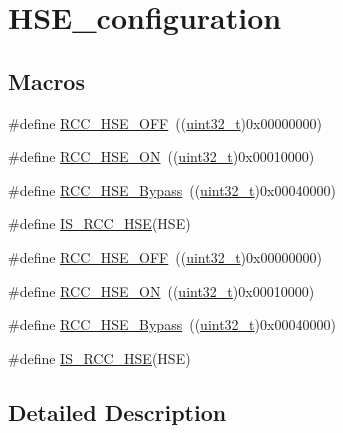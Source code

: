 \hypertarget{group___h_s_e__configuration}{}\section{H\+S\+E\+\_\+configuration}
\label{group___h_s_e__configuration}
\subsection*{Macros}
\begin{DoxyCompactItemize}
\item 
\#define \hyperlink{group___h_s_e__configuration_ga1616626d23fbce440398578855df6f97}{R\+C\+C\+\_\+\+H\+S\+E\+\_\+\+O\+FF}~((\hyperlink{_p_e___types_8h_a33594304e786b158f3fb30289278f5af}{uint32\+\_\+t})0x00000000)
\item 
\#define \hyperlink{group___h_s_e__configuration_gabc4f70a44776c557af20496b04d9a9db}{R\+C\+C\+\_\+\+H\+S\+E\+\_\+\+ON}~((\hyperlink{_p_e___types_8h_a33594304e786b158f3fb30289278f5af}{uint32\+\_\+t})0x00010000)
\item 
\#define \hyperlink{group___h_s_e__configuration_ga09061e9909d5f588baa7bfb0f7edd9fa}{R\+C\+C\+\_\+\+H\+S\+E\+\_\+\+Bypass}~((\hyperlink{_p_e___types_8h_a33594304e786b158f3fb30289278f5af}{uint32\+\_\+t})0x00040000)
\item 
\#define \hyperlink{group___h_s_e__configuration_ga287bbcafd73d07ec915c2f793301908a}{I\+S\+\_\+\+R\+C\+C\+\_\+\+H\+SE}(H\+SE)
\item 
\#define \hyperlink{group___h_s_e__configuration_ga1616626d23fbce440398578855df6f97}{R\+C\+C\+\_\+\+H\+S\+E\+\_\+\+O\+FF}~((\hyperlink{_p_e___types_8h_a33594304e786b158f3fb30289278f5af}{uint32\+\_\+t})0x00000000)
\item 
\#define \hyperlink{group___h_s_e__configuration_gabc4f70a44776c557af20496b04d9a9db}{R\+C\+C\+\_\+\+H\+S\+E\+\_\+\+ON}~((\hyperlink{_p_e___types_8h_a33594304e786b158f3fb30289278f5af}{uint32\+\_\+t})0x00010000)
\item 
\#define \hyperlink{group___h_s_e__configuration_ga09061e9909d5f588baa7bfb0f7edd9fa}{R\+C\+C\+\_\+\+H\+S\+E\+\_\+\+Bypass}~((\hyperlink{_p_e___types_8h_a33594304e786b158f3fb30289278f5af}{uint32\+\_\+t})0x00040000)
\item 
\#define \hyperlink{group___h_s_e__configuration_ga287bbcafd73d07ec915c2f793301908a}{I\+S\+\_\+\+R\+C\+C\+\_\+\+H\+SE}(H\+SE)
\end{DoxyCompactItemize}


\subsection{Detailed Description}


